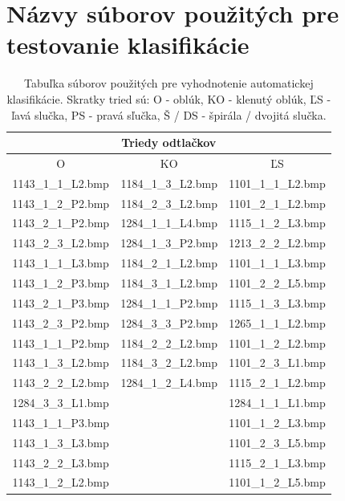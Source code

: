 \chapter{Názvy súborov použitých pre testovanie klasifikácie} \label{priloha:zoznam_suborov}
  \begin{table}[ht]
    \centering
    \caption{Tabuľka súborov použitých pre vyhodnotenie automatickej klasifikácie. Skratky tried sú: O - oblúk, KO - klenutý oblúk,
    ĽS - ľavá slučka, PS - pravá sľučka, Š / DS - špirála / dvojitá slučka.}
    \begin{tabular}{ | c | c | c | }
      \hline
      \multicolumn{3}{|c|}{Triedy odtlačkov}            \\
      \hline
      O       & KO        & ĽS \\
      \hline
      1143\_1\_1\_L2.bmp & 1184\_1\_3\_L2.bmp & 1101\_1\_1\_L2.bmp  \\
      1143\_1\_2\_P2.bmp & 1184\_2\_3\_L2.bmp & 1101\_2\_1\_L2.bmp  \\
      1143\_2\_1\_P2.bmp & 1284\_1\_1\_L4.bmp & 1115\_1\_2\_L3.bmp  \\
      1143\_2\_3\_L2.bmp & 1284\_1\_3\_P2.bmp & 1213\_2\_2\_L2.bmp  \\
      1143\_1\_1\_L3.bmp & 1184\_2\_1\_L2.bmp & 1101\_1\_1\_L3.bmp  \\
      1143\_1\_2\_P3.bmp & 1184\_3\_1\_L2.bmp & 1101\_2\_2\_L5.bmp  \\
      1143\_2\_1\_P3.bmp & 1284\_1\_1\_P2.bmp & 1115\_1\_3\_L3.bmp  \\
      1143\_2\_3\_P2.bmp & 1284\_3\_3\_P2.bmp & 1265\_1\_1\_L2.bmp  \\
      1143\_1\_1\_P2.bmp & 1184\_2\_2\_L2.bmp & 1101\_1\_2\_L2.bmp  \\
      1143\_1\_3\_L2.bmp & 1184\_3\_2\_L2.bmp & 1101\_2\_3\_L1.bmp  \\
      1143\_2\_2\_L2.bmp & 1284\_1\_2\_L4.bmp & 1115\_2\_1\_L2.bmp  \\
      1284\_3\_3\_L1.bmp &                 & 1284\_1\_1\_L1.bmp     \\
      1143\_1\_1\_P3.bmp &                 & 1101\_1\_2\_L3.bmp     \\
      1143\_1\_3\_L3.bmp &                 & 1101\_2\_3\_L5.bmp     \\
      1143\_2\_2\_L3.bmp &                 & 1115\_2\_1\_L3.bmp     \\
      1143\_1\_2\_L2.bmp &                 & 1101\_1\_2\_L5.bmp     \\

\end{tabular}
\end{table}
